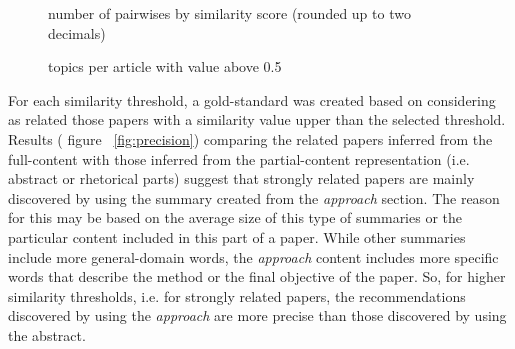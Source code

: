 \begin{figure}[!htb]\centering
   \begin{minipage}{0.49\textwidth}
     \caption{number of pairwises by similarity score (rounded up to two decimals)}\label{fig:similarities}
   \end{minipage}
   \begin {minipage}[c]{0.49\textwidth}
     \caption{topics per article with value above 0.5}\label{fig:articleTopics}
   \end{minipage}
\end{figure}

For each similarity threshold, a gold-standard was created based on considering as related those papers with a similarity value upper than the selected threshold. Results ( figure ~\ref{fig:precision}) comparing the related papers inferred from the full-content with those inferred from the partial-content representation (i.e. abstract or rhetorical parts) suggest that strongly related papers are mainly discovered by using the summary created from the \textit{approach} section. The reason for this may be based on the average size of this type of summaries or the particular content included in this part of a paper. While other summaries include more general-domain words, the \textit{approach} content includes more specific words that describe the method or the final objective of the paper. So, for higher similarity thresholds, i.e. for strongly related papers, the recommendations discovered by using the \textit{approach} are more precise than those discovered by using the abstract.

